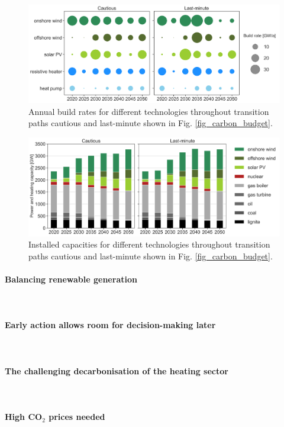 \documentclass[5p]{elsarticle} %
\begin{document}
\begin{figure}[!h]
\centering
\includegraphics[width=\columnwidth]{figures/build_rates.png}
\caption{Annual build rates for different technologies throughout transition paths cautious and last-minute shown in Fig. \ref{fig_carbon_budget}.} \label{fig_build_rates} 
\end{figure}

\begin{figure}[!h]
	\centering
	\includegraphics[width=\columnwidth]{figures/installed_capacity.png}
	\caption{Installed capacities for different technologies throughout transition paths cautious and last-minute shown in Fig. \ref{fig_carbon_budget}.} \label{fig_installed_capacity} 
\end{figure}

\paragraph{\textbf{Balancing renewable generation}} \
\paragraph{\textbf{Early action allows room for decision-making later}} \
\paragraph{\textbf{The challenging decarbonisation of the heating sector}} \
\paragraph{\textbf{High CO$_2$ prices needed}} \
\end{document}
